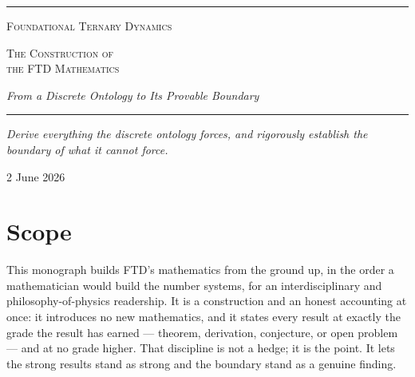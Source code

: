
\begin{titlingpage}
  \vspace*{0.72in}
  \noindent\rule{\textwidth}{1.05pt}\par
  \vspace{0.28in}
  {\small\scshape Foundational Ternary Dynamics\par}
  \vspace{0.22in}
  {\Huge\scshape The Construction of\\[5pt] the FTD Mathematics\par}
  \vspace{0.18in}
  {\Large\itshape From a Discrete Ontology to Its Provable Boundary\par}
  \vspace{0.38in}
  \noindent\rule{0.64\textwidth}{0.35pt}\par
  \vspace{0.28in}
  \begin{minipage}{0.84\textwidth}
    \large\itshape
    Derive everything the discrete ontology forces, and rigorously establish
    the boundary of what it cannot force.
  \end{minipage}\par
  \vfill
  \hfill{\small 2 June 2026\par}
  \vspace*{0.18in}
\end{titlingpage}

\section*{Scope}
\noindent This monograph builds FTD's mathematics from the ground up, in the
order a mathematician would build the number systems, for an interdisciplinary
and philosophy-of-physics readership. It is a construction and an honest
accounting at once: it introduces no new mathematics, and it states every result
at exactly the grade the result has earned --- theorem, derivation, conjecture,
or open problem --- and at no grade higher. That discipline is not a hedge; it is
the point. It lets the strong results stand as strong and the boundary stand as a
genuine finding.

